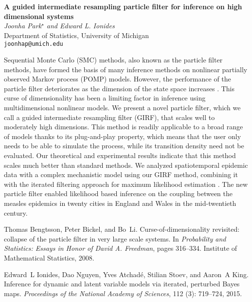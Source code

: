 \documentclass[12pt]{article}
\newcommand{\postertitle}[1]{{\Large\bf #1}\\[12pt]}
\newcommand{\authors}[1]{\emph{#1}\\}
\newcommand{\affiliations}[1]{{#1}\\}
\newcommand{\contacts}[1]{{#1}}
\begin{document}
\begin{center}
\vspace*{0.5cm}
%
\postertitle{A guided intermediate resampling particle filter for inference on high dimensional systems}
%
\authors{Joonha Park$^\star$ and Edward L. Ionides} %
% 
\affiliations{Department of Statistics, University of Michigan}
%
\contacts{\texttt{joonhap@umich.edu}} %
%
\vspace*{0.3cm}
\end{center}

Sequential Monte Carlo (SMC) methods, also known as the particle filter methods, have formed the basis of many inference methods on nonlinear partially observed Markov process (POMP) models. However, the performance of the particle filter deteriorates as the dimension of the state space increases \cite{bengtsson2008curse}. This curse of dimensionality has been a limiting factor in inference using multidimensional nonlinear models. We present a novel particle filter, which we call a guided intermediate resampling filter (GIRF), that scales well to moderately high dimensions. This method is readily applicable to a broad range of models thanks to its plug-and-play property, which means that the user only needs to be able to simulate the process, while its transition density need not be evaluated. Our theoretical and experimental results indicate that this method scales much better than standard methods. We analyzed spatiotemporal epidemic data with a complex mechanistic model using our GIRF method, combining it with the iterated filtering approach for maximum likelihood estimation \cite{ionides2015inference}. The new particle filter enabled likelihood based inference on the coupling between the measles epidemics in twenty cities in England and Wales in the mid-twentieth century.


\begin{thebibliography}{2}
Thomas Bengtsson, Peter Bickel, and Bo~Li.
\newblock Curse-of-dimensionality revisited: collapse of the particle filter in
  very large scale systems.
\newblock In \emph{Probability and Statistics: Essays in Honor of David A.
  Freedman}, pages 316--334. Institute of Mathematical Statistics, 2008.

Edward~L Ionides, Dao Nguyen, Yves Atchad{\'e}, Stilian Stoev, and Aaron~A
  King.
\newblock Inference for dynamic and latent variable models via iterated,
  perturbed {B}ayes maps.
\newblock \emph{Proceedings of the National Academy of Sciences}, 112
  (3): 719--724, 2015.

\end{thebibliography}
\end{document}
